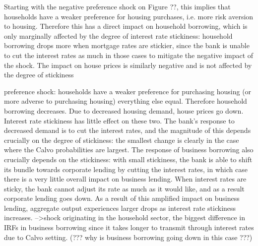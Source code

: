 \documentclass[12pt]{article}
\numberwithin{equation}{section}
\begin{document}
Starting with the negative preference shock on Figure ??, this implies that households have a weaker preference for housing purchases, i.e. more risk aversion to housing. Therefore this has a direct impact on household borrowing, which is only marginally affected by the degree of interest rate stickiness: household borrowing drops more when mortgage rates are stickier, since the bank is unable to cut the interest rates as much in those cases to mitigate the negative impact of the shock. The impact on house prices is similarly negative and is not affected by the degree of stickiness

preference shock: households have a weaker preference for purchasing housing (or more adverse to purchasing housing) everything else equal. Therefore household borrowing decreases. Due to decreased housing demand, house prices go down. Interest rate stickiness has little effect on these two. The bank's response to decreased demand is to cut the interest rates, and the magnitude of this depends crucially on the degree of stickiness: the smallest change is clearly in the case where the Calvo probabilities are largest. The response of business borrowing also crucially depends on the stickiness: with small stickiness, the bank is able to shift its bundle towards corporate lending by cutting the interest rates, in which case there is a very little overall impact on business lending. When interest rates are sticky, the bank cannot adjust its rate as much as it would like, and as a result corporate lending goes down. As a result of this amplified impact on business lending, aggregate output  experiences larger drops as interest rate stickiness increases.
-->shock originating in the household sector, the biggest difference in IRFs in business borrowing since it takes longer to transmit through interest rates due to Calvo setting. 
(??? why is business borrowing going down in this case ???)
\end{document}
